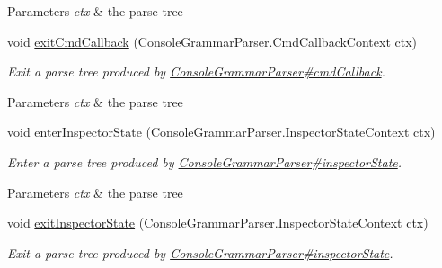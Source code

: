 \begin{DoxyCompactItemize}
\begin{DoxyCompactList}
\begin{DoxyParams}{Parameters}
{\em ctx} & the parse tree\\
\hline
\end{DoxyParams}
 \end{DoxyCompactList}\item 
void \hyperlink{classgov_1_1nasa_1_1jpf_1_1inspector_1_1client_1_1parser_1_1_console_grammar_base_listener_abbaa439452533763b1d05a46d0b175c7}{exit\+Cmd\+Callback} (Console\+Grammar\+Parser.\+Cmd\+Callback\+Context ctx)
\begin{DoxyCompactList}\small\item\em Exit a parse tree produced by \hyperlink{classgov_1_1nasa_1_1jpf_1_1inspector_1_1client_1_1parser_1_1_console_grammar_parser_af893e7316098e4d23ed6419676687461}{Console\+Grammar\+Parser\#cmd\+Callback}.


\begin{DoxyParams}{Parameters}
{\em ctx} & the parse tree\\
\hline
\end{DoxyParams}
 \end{DoxyCompactList}\item 
void \hyperlink{classgov_1_1nasa_1_1jpf_1_1inspector_1_1client_1_1parser_1_1_console_grammar_base_listener_ae72f9b6e29029ad17a7d89cf27839c6e}{enter\+Inspector\+State} (Console\+Grammar\+Parser.\+Inspector\+State\+Context ctx)
\begin{DoxyCompactList}\small\item\em Enter a parse tree produced by \hyperlink{classgov_1_1nasa_1_1jpf_1_1inspector_1_1client_1_1parser_1_1_console_grammar_parser_ab57ca165e59675ed40c9b04da3c7d569}{Console\+Grammar\+Parser\#inspector\+State}.


\begin{DoxyParams}{Parameters}
{\em ctx} & the parse tree\\
\hline
\end{DoxyParams}
 \end{DoxyCompactList}\item 
void \hyperlink{classgov_1_1nasa_1_1jpf_1_1inspector_1_1client_1_1parser_1_1_console_grammar_base_listener_ae3eef64c383f03960545eb82c5762f93}{exit\+Inspector\+State} (Console\+Grammar\+Parser.\+Inspector\+State\+Context ctx)
\begin{DoxyCompactList}\small\item\em Exit a parse tree produced by \hyperlink{classgov_1_1nasa_1_1jpf_1_1inspector_1_1client_1_1parser_1_1_console_grammar_parser_ab57ca165e59675ed40c9b04da3c7d569}{Console\+Grammar\+Parser\#inspector\+State}.



\end{DoxyCompactList}
\end{DoxyCompactItemize}
